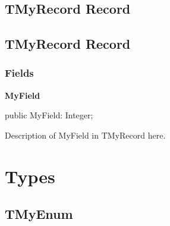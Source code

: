 \documentclass{report}
\newif\ifpdf
\begin{document}
\subsection*{\large{\textbf{TMyRecord Record}}\normalsize\hspace{1ex}\hrulefill}
\else
\subsection*{TMyRecord Record}
\fi
\label{ok_value_member_tags.TMyRecord}
\subsubsection*{\large{\textbf{Fields}}\normalsize\hspace{1ex}\hfill}
\begin{list}{}{
\setlength{\itemindent}{0cm}
\setlength{\listparindent}{0cm}
\setlength{\leftmargin}{\evensidemargin}
\addtolength{\leftmargin}{\tmplength}
\settowidth{\labelsep}{X}
\addtolength{\leftmargin}{\labelsep}
\setlength{\labelwidth}{\tmplength}
}
\label{ok_value_member_tags.TMyRecord-MyField}
\item[\textbf{MyField}\hfill]
\ifpdf
\begin{flushleft}
\fi
\begin{ttfamily}
public MyField: Integer;\end{ttfamily}

\ifpdf
\end{flushleft}
\fi


\par Description of MyField in TMyRecord here.\end{list}
\section{Types}
\ifpdf
\subsection*{\large{\textbf{TMyEnum}}\normalsize\hspace{1ex}\hrulefill}
\else
\end{document}
